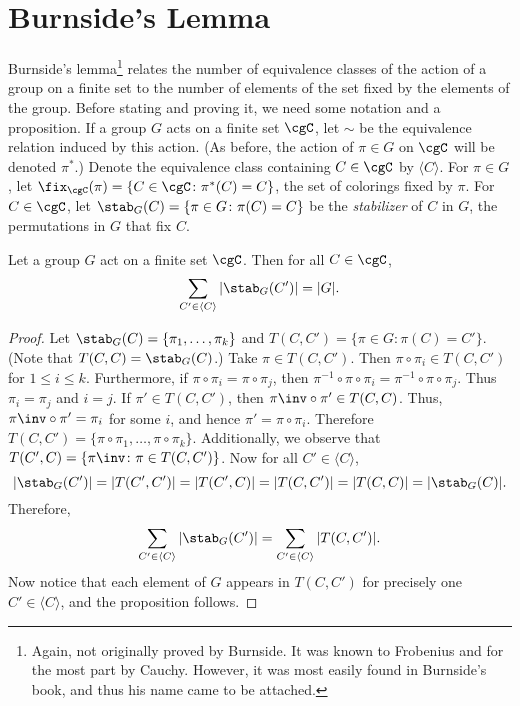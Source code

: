\section{Burnside's Lemma}\label{s:polya:burnside}

Burnside's lemma\footnote{Again, not originally proved by Burnside. It
  was known to Frobenius and for the most part by Cauchy. However, it
  was most easily found in Burnside's book, and thus his name came to
  be attached.} relates the number of equivalence classes of the
action of a group on a finite set to the number of elements of the set
fixed by the elements of the group. Before stating and proving it, we
need some notation and a proposition. If a group $G$ acts on a finite
set $\cgC$, let $\sim$ be the equivalence relation induced by this
action. (As before, the action of $\pi\in G$ on $\cgC$ will be denoted
$\pi^*$.) Denote the equivalence class containing $C\in \cgC$ by
$\langle C\rangle$. For $\pi\in G$, let $\fix_\cgC(\pi)=\{C\in
\cgC\colon \pi^*(C) = C\}$, the set of colorings fixed by $\pi$. For
$C\in\cgC$, let $\stab_G(C)=\{\pi\in G\colon \pi(C) = C\}$ be the
\emph{stabilizer} of $C$ in $G$, the permutations in $G$ that fix $C$.

\begin{proposition}\label{prop:polya:sum-stabs}
  Let a group $G$ act on a finite set $\cgC$. Then for all $C\in \cgC$,
  \[\sum_{C'\in\langle C\rangle} |\stab_G(C')| = |G|.\]
\end{proposition}

\begin{proof}
  Let $\stab_G(C) = \{\pi_1,\dots,\pi_k\}$ and $T(C,C') = \{\pi\in
  G\colon \pi(C) = C'\}$. (Note that $T(C,C) = \stab_G(C)$.) Take
  $\pi\in T(C,C')$. Then $\pi\circ \pi_i\in T(C,C')$ for $1\leq i\leq
  k$. Furthermore, if $\pi\circ \pi_i = \pi\circ \pi_j$, then
  $\pi^{-1}\circ\pi\circ \pi_i=\pi^{-1}\circ\pi\circ \pi_j$. Thus
  $\pi_i=\pi_j$ and $i=j$. If $\pi'\in T(C,C')$, then $\pi\inv\circ
  \pi'\in T(C,C)$. Thus, $\pi\inv\circ\pi' = \pi_i$ for some $i$, and
  hence $\pi' = \pi\circ \pi_i$. Therefore $T(C,C') =
  \{\pi\circ\pi_1,\dots,\pi\circ\pi_k\}$. Additionally, we observe
  that $T(C',C) = \{\pi\inv\colon \pi\in T(C,C')\}$. Now for all
  $C'\in\langle C\rangle$, \[|\stab_G(C')|=|T(C',C')|=|T(C',C)| =
  |T(C,C')| = |T(C,C)| = |\stab_G(C)|.\]
  Therefore, \[\sum_{C'\in\langle C\rangle}|\stab_G(C')| =
  \sum_{C'\in\langle C\rangle} |T(C,C')|.\] Now notice that each
  element of $G$ appears in $T(C,C')$ for precisely one $C'\in\langle
  C\rangle$, and the proposition follows.
\end{proof}

